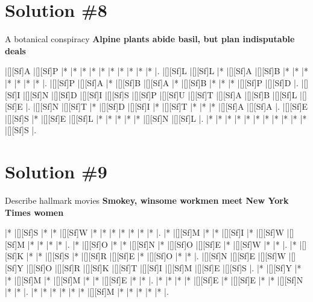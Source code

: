 \documentclass[letterpaper]{article}
\begin{document}
\newpage
\section*{Solution \#8}
A botanical conspiracy
\newline\textbf{Alpine plants abide basil, but plan indisputable deals}

\vspace*{1em}
\begin{Puzzle}{12}{7}
|[][Sf]A  |[][Sf]P  |*        |*        |*        |*        |*        |*        |*        |*        |*        |*        |.  
|[][Sf]L  |[][Sf]L  |*        |[][Sf]A  |[][Sf]B  |*        |*        |*        |*        |*        |*        |*        |.
|[][Sf]P  |[][Sf]A  |*        |[][Sf]B  |[][Sf]A  |*        |[][Sf]B  |*        |*        |*        |[][Sf]P  |[][Sf]D  |.  
|[][Sf]I  |[][Sf]N  |[][Sf]D  |[][Sf]I  |[][Sf]S  |[][Sf]P  |[][Sf]U  |[][Sf]T  |[][Sf]A  |[][Sf]B  |[][Sf]L  |[][Sf]E  |.
|[][Sf]N  |[][Sf]T  |*        |[][Sf]D  |[][Sf]I  |*        |[][Sf]T  |*        |*        |*        |[][Sf]A  |[][Sf]A  |. 
|[][Sf]E  |[][Sf]S  |*        |[][Sf]E  |[][Sf]L  |*        |*        |*        |*        |*        |[][Sf]N  |[][Sf]L  |.
|*        |*        |*        |*        |*        |*        |*        |*        |*        |*        |*        |[][Sf]S  |.
\end{Puzzle}

\newpage
\section*{Solution \#9}
Describe hallmark movies
\newline\textbf{Smokey, winsome workmen meet New York Times women}

\vspace*{1em}
\begin{Puzzle}{12}{8}
|*        |[][Sf]S  |*        |*        |[][Sf]W  |*        |*        |*        |*        |*        |*        |*        |.
|*        |[][Sf]M  |*        |*        |[][Sf]I  |*        |[][Sf]W  |[][Sf]M  |*        |*        |*        |*        |.
|*        |[][Sf]O  |*        |*        |[][Sf]N  |*        |[][Sf]O  |[][Sf]E  |*        |[][Sf]W  |*        |*        |.
|*        |[][Sf]K  |*        |*        |[][Sf]S  |*        |[][Sf]R  |[][Sf]E  |*        |[][Sf]O  |*        |*        |.
|[][Sf]N  |[][Sf]E  |[][Sf]W  |[][Sf]Y  |[][Sf]O  |[][Sf]R  |[][Sf]K  |[][Sf]T  |[][Sf]I  |[][Sf]M  |[][Sf]E  |[][Sf]S  |.
|*        |[][Sf]Y  |*        |*        |[][Sf]M  |*        |[][Sf]M  |*        |*        |[][Sf]E  |*        |*        |.
|*        |*        |*        |*        |[][Sf]E  |*        |[][Sf]E  |*        |*        |[][Sf]N  |*        |*        |.
|*        |*        |*        |*        |*        |*        |[][Sf]M  |*        |*        |*        |*        |*        |.
\end{Puzzle}
\end{document}
